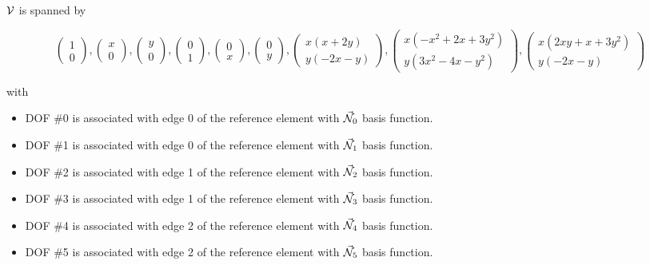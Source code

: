\begin{itemize}
${\cal V}$ is spanned by
\begin{small} 
\[
\left(\begin{array}{c}
1 \\ 0
\end{array}\right),
\left(\begin{array}{c}
 x \\ 0
\end{array}\right),
\left(\begin{array}{c}
y \\ 0
\end{array}\right),
\left(\begin{array}{c}
0 \\ 1
\end{array}\right),
\left(\begin{array}{c}
0 \\ x
\end{array}\right),
\left(\begin{array}{c}
0 \\ y
\end{array}\right),
\left(\begin{array}{c}
x(x+2y) \\ y (-2x-y)
\end{array}\right),
\left(\begin{array}{c}
x(-x^2+2x+3y^2) \\ y(3x^2-4x-y^2)
\end{array}\right),
\left(\begin{array}{c}
x(2xy+x+3y^2) \\ y(-2x-y)
\end{array}\right)
\]
\end{small}
with 
\begin{itemize}
\item DOF \#0 is associated with edge 0 of the reference element with $\vec{{\mathcal{N}}}_0$ basis function.
\item DOF \#1 is associated with edge 0 of the reference element with $\vec{{\mathcal{N}}}_1$ basis function.
\item DOF \#2 is associated with edge 1 of the reference element with $\vec{{\mathcal{N}}}_2$ basis function.
\item DOF \#3 is associated with edge 1 of the reference element with $\vec{{\mathcal{N}}}_3$ basis function.
\item DOF \#4 is associated with edge 2 of the reference element with $\vec{{\mathcal{N}}}_4$ basis function.
\item DOF \#5 is associated with edge 2 of the reference element with $\vec{{\mathcal{N}}}_5$ basis function.

\end{itemize}
\end{itemize}
